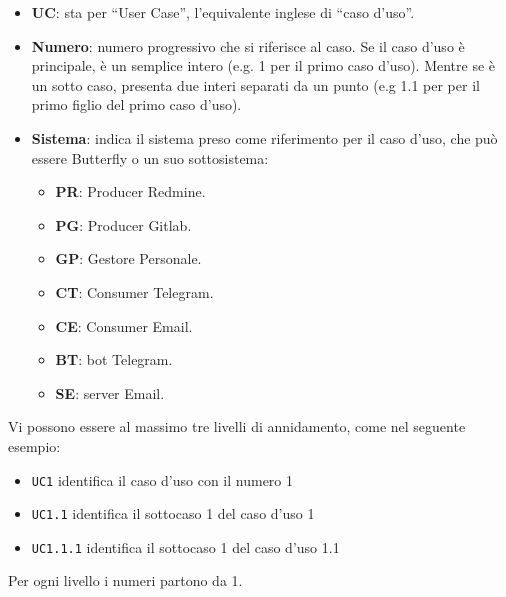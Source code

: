 		\begin{itemize}
			\item \textbf{UC}: sta per ``User Case'', l'equivalente inglese di ``caso d'uso''.
			\item \textbf{Numero}: numero progressivo che si riferisce al caso. Se il caso d'uso è principale, è un semplice intero (e.g. 1 per il primo caso d'uso). Mentre se è un sotto caso, presenta due interi separati da un punto (e.g 1.1 per per il primo figlio del primo caso d'uso).
			\item \textbf{Sistema}: indica il sistema preso come riferimento per il caso d'uso, che può essere Butterfly o un suo sottosistema:
			\begin{itemize}
				\item \textbf{PR}: Producer Redmine.
				\item \textbf{PG}: Producer Gitlab.
				\item \textbf{GP}: Gestore Personale.
				\item \textbf{CT}: Consumer Telegram.
				\item \textbf{CE}: Consumer Email.
				\item \textbf{BT}: bot Telegram.
				\item \textbf{SE}: server Email.
			\end{itemize}
		\end{itemize}

		Vi possono essere al massimo tre livelli di annidamento, come nel seguente esempio:
		\begin{itemize}
			\item \texttt{UC1} identifica il caso d'uso con il numero 1
			\item \texttt{UC1.1} identifica il sottocaso 1 del caso d'uso 1
			\item \texttt{UC1.1.1} identifica il sottocaso 1 del caso d'uso 1.1
		\end{itemize}
		Per ogni livello i numeri partono da 1.

